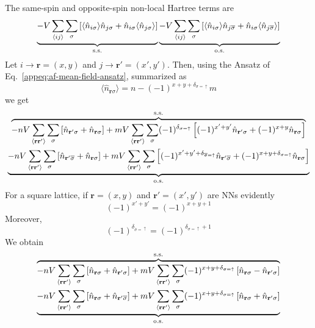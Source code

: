 The same-spin and opposite-spin non-local Hartree terms are
\[
	\underbrace{
		-V \sum_{\ev{ij}} \sum_\sigma \left[
			\langle 
				\hat n_{i\sigma}
			\rangle \hat n_{j\sigma} + \hat n_{i\sigma} \langle 
				\hat n_{j\sigma}
			\rangle
		\right]
	}_{\mathrm{s.s.}}
	\underbrace{
		-V \sum_{\ev{ij}} \sum_\sigma \left[
			\langle
				\hat n_{i\sigma}
			\rangle \hat n_{j\overline{\sigma}} + \hat n_{i\sigma} \langle 
				\hat n_{j\overline{\sigma}}
			\rangle
		\right]
	}_{\mathrm{o.s.}}
\]
Let $i \to \mathbf{r} = (x,y)$ and $j \to \mathbf{r}' = (x',y')$. Then, using the Ansatz of Eq.~\ref{appeq:af-mean-field-ansatz}, summarized as
\[
	\langle \hat n_{\mathbf{r}\sigma} \rangle = n - (-1)^{x+y+\delta_{\sigma=\uparrow}} m
\]
we get
\begin{multline*}
	\overbrace{
		-nV \sum_{\ev{\mathbf{r}\mathbf{r}'}} \sum_\sigma \left[
			\hat n_{\mathbf{r}'\sigma} + \hat n_{\mathbf{r}\sigma}
		\right] + mV \sum_{\ev{\mathbf{r}\mathbf{r}'}} \sum_\sigma (-1)^{\delta_{\sigma=\uparrow}} \left[
			(-1)^{x'+y'} \hat n_{\mathbf{r}'\sigma} + (-1)^{x+y} \hat n_{\mathbf{r}\sigma}
		\right]
	}^{\mathrm{s.s.}} \\
	\underbrace{
		-nV \sum_{\ev{\mathbf{r}\mathbf{r}'}} \sum_\sigma \left[
			\hat n_{\mathbf{r}'\overline{\sigma}} + \hat n_{\mathbf{r}\sigma}
		\right] + mV \sum_{\ev{\mathbf{r}\mathbf{r}'}} \sum_\sigma \left[
			(-1)^{x'+y'+\delta_{\overline{\sigma}=\uparrow}} \hat n_{\mathbf{r}'\overline{\sigma}} + (-1)^{x+y+\delta_{\sigma=\uparrow}} \hat n_{\mathbf{r}\sigma}
		\right]
	}_{\mathrm{o.s.}}
\end{multline*}
For a square lattice, if $\mathbf{r} = (x,y)$ and $\mathbf{r}' = (x',y')$ are NNs evidently
\[
	(-1)^{x'+y'} = (-1)^{x+y+1}
\]
Moreover,
\[
	(-1)^{\delta_{\overline{\sigma}=\uparrow}} = (-1)^{\delta_{\sigma=\uparrow}+1}
\]
We obtain
\begin{multline}
	\overbrace{
		-nV \sum_{\ev{\mathbf{r}\mathbf{r}'}} \sum_\sigma \left[
			\hat n_{\mathbf{r}\sigma} + \hat n_{\mathbf{r}'\sigma}
		\right] + mV \sum_{\ev{\mathbf{r}\mathbf{r}'}} \sum_\sigma (-1)^{x+y+\delta_{\sigma=\uparrow}} \left[
			\hat n_{\mathbf{r}\sigma} - \hat n_{\mathbf{r}'\sigma}
		\right]
	}^{\mathrm{s.s.}} \\
	\underbrace{
		-nV \sum_{\ev{\mathbf{r}\mathbf{r}'}} \sum_\sigma \left[
			\hat n_{\mathbf{r}\sigma} + \hat n_{\mathbf{r}'\overline{\sigma}}
		\right] + mV \sum_{\ev{\mathbf{r}\mathbf{r}'}} \sum_\sigma (-1)^{x+y+\delta_{\sigma=\uparrow}} \left[
			\hat n_{\mathbf{r}\sigma} + \hat n_{\mathbf{r}'\sigma}
		\right]
	}_{\mathrm{o.s.}}
	\label{eq:af-hartree-renormalization-intermediate}
\end{multline}
